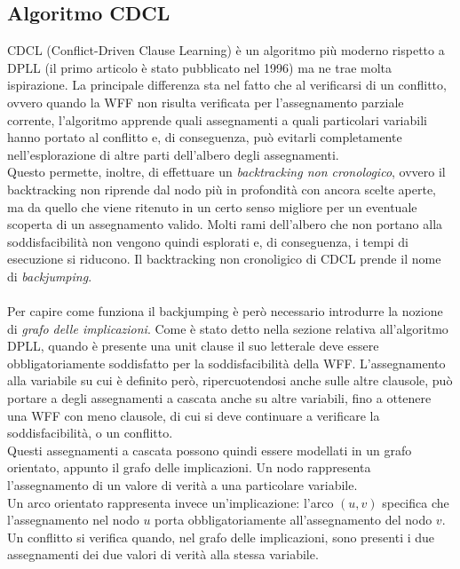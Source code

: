 \subsection{Algoritmo CDCL}
CDCL (Conflict-Driven Clause Learning) \cite{handbook-cdcl} è un algoritmo più moderno rispetto a DPLL (il primo articolo
è stato pubblicato nel 1996) ma ne trae molta ispirazione.
La principale differenza sta nel fatto che al verificarsi di un conflitto, ovvero quando
la WFF non risulta verificata per l'assegnamento parziale corrente, l'algoritmo apprende quali assegnamenti a quali 
particolari variabili hanno portato al conflitto e, di conseguenza, può evitarli completamente nell'esplorazione di altre parti dell'albero degli assegnamenti.\\
Questo permette, inoltre, di effettuare un \textit{backtracking non cronologico}, ovvero 
il backtracking non riprende dal nodo più in profondità con ancora scelte aperte, ma da quello
che viene ritenuto in un certo senso migliore per un eventuale scoperta di un assegnamento valido.
Molti rami dell'albero che non portano alla soddisfacibilità non vengono quindi esplorati e,
di conseguenza, i tempi di esecuzione si riducono.
Il backtracking non cronoligico di CDCL prende il nome di \textit{backjumping}.\\
\\
Per capire come funziona il backjumping è però necessario introdurre
la nozione di \textit{grafo delle implicazioni}.
Come è stato detto nella sezione relativa all'algoritmo DPLL,
quando è presente una unit clause il suo letterale deve essere obbligatoriamente soddisfatto per la soddisfacibilità della WFF.
L'assegnamento alla variabile su cui è definito però, ripercuotendosi anche sulle altre clausole,
può portare a degli assegnamenti a cascata anche su altre variabili, fino a ottenere una WFF
con meno clausole, di cui si deve continuare a verificare la soddisfacibilità, o un conflitto.\\
Questi assegnamenti a cascata possono quindi essere modellati in un grafo orientato, appunto il grafo delle
implicazioni.
Un nodo rappresenta l'assegnamento di un valore di verità a una particolare variabile.\\
Un arco orientato rappresenta invece un'implicazione: l'arco $(u, v)$ specifica che l'assegnamento
nel nodo $u$ porta obbligatoriamente all'assegnamento del nodo $v$.
Un conflitto si verifica quando, nel grafo delle implicazioni, sono presenti i due assegnamenti 
dei due valori di verità alla stessa variabile.

